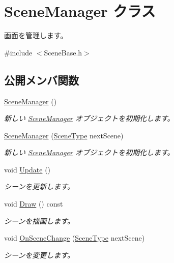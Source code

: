 \hypertarget{class_scene_manager}{}\section{Scene\+Manager クラス}
\label{class_scene_manager}


画面を管理します。 




{\ttfamily \#include $<$Scene\+Base.\+h$>$}

\subsection*{公開メンバ関数}
\begin{DoxyCompactItemize}
\item 
\hyperlink{class_scene_manager_a52085e6737c23b491c228e86781af808}{Scene\+Manager} ()
\begin{DoxyCompactList}\small\item\em 新しい \hyperlink{class_scene_manager}{Scene\+Manager} オブジェクトを初期化します。\end{DoxyCompactList}\item 
\hyperlink{class_scene_manager_a3ac7c1263eefc696a69c8c570ba481b0}{Scene\+Manager} (\hyperlink{_scene_base_8h_a006282dc9ad93696316e776700c3c948}{Scene\+Type} next\+Scene)
\begin{DoxyCompactList}\small\item\em 新しい \hyperlink{class_scene_manager}{Scene\+Manager} オブジェクトを初期化します。\end{DoxyCompactList}\item 
void \hyperlink{class_scene_manager_a63dcf65832d6a2c190bf496d9a3b00a3}{Update} ()
\begin{DoxyCompactList}\small\item\em シーンを更新します。\end{DoxyCompactList}\item 
void \hyperlink{class_scene_manager_ab1da7cddc28c54d6a8dc9b91d3c94a6c}{Draw} () const 
\begin{DoxyCompactList}\small\item\em シーンを描画します。\end{DoxyCompactList}\item 
void \hyperlink{class_scene_manager_a1defdb68759e3d118f91d57f49425167}{On\+Scene\+Change} (\hyperlink{_scene_base_8h_a006282dc9ad93696316e776700c3c948}{Scene\+Type} next\+Scene)
\begin{DoxyCompactList}\small\item\em シーンを変更します。\end{DoxyCompactList}\end{DoxyCompactItemize}


